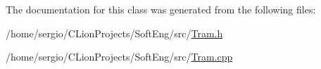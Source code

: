 The documentation for this class was generated from the following files\+:\begin{DoxyCompactItemize}
\item 
/home/sergio/\+C\+Lion\+Projects/\+Soft\+Eng/src/\hyperlink{_tram_8h}{Tram.\+h}\item 
/home/sergio/\+C\+Lion\+Projects/\+Soft\+Eng/src/\hyperlink{_tram_8cpp}{Tram.\+cpp}\end{DoxyCompactItemize}
